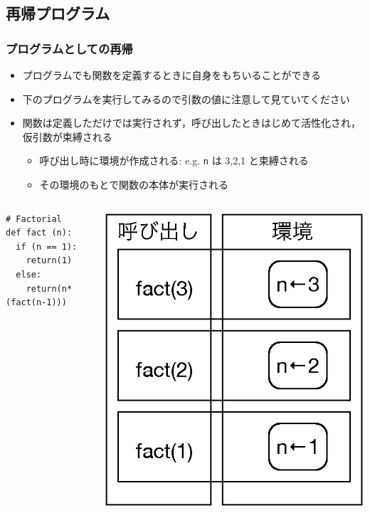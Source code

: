 \subsection{再帰プログラム}
\begin{frame}[fragile]
\frametitle{プログラムとしての再帰}
  \begin{itemize}
\item プログラムでも関数を定義するときに自身をもちいることができる
\item 下のプログラムを実行してみるので引数の値に注意して見ていてください
\item 関数は定義しただけでは実行されず，呼び出したときはじめて活性化され，仮引数が束縛される
    \begin{itemize}
\item 呼び出し時に環境が作成される: e.g. {\tt n} は 3,2,1 と束縛される
\item その環境のもとで関数の本体が実行される
    \end{itemize}
  \end{itemize}
  \begin{columns}[c]
    \begin{column}{0.6\textwidth}
      \begin{lstlisting}[caption={fact.py},label=fact-with-puts]
# Factorial
def fact (n):
  if (n == 1):
    return(1)
  else:
    return(n*(fact(n-1)))
      \end{lstlisting}
    \end{column}
    \begin{column}{0.35\textwidth}
      \begin{center}
\includegraphics[scale=0.3]{./Figure/elementaryCS-2nd-figStack.eps}
      \end{center}
    \end{column}
  \end{columns}
\end{frame}
